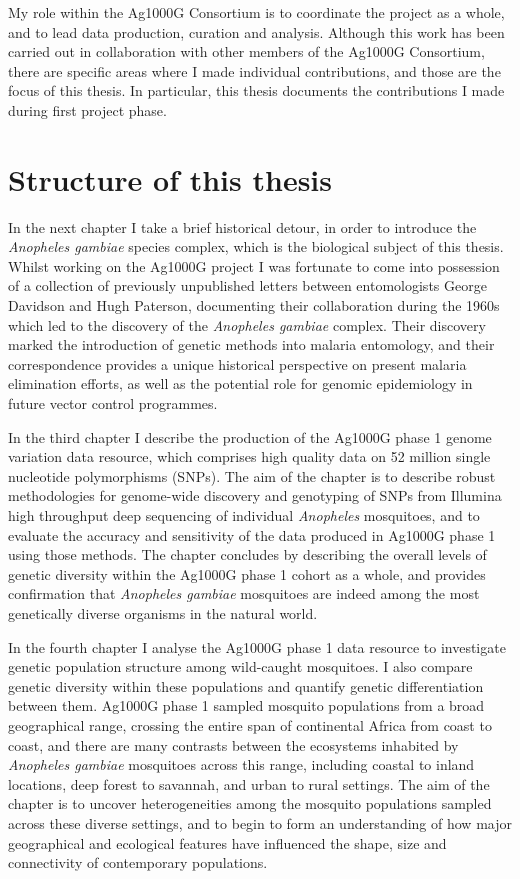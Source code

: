 \documentclass[a4paper,11pt,abstracton,hidelinks]{scrartcl}
\begin{document}
My role within the Ag1000G Consortium is to coordinate the project as a whole, and to lead data production, curation and analysis.
%
Although this work has been carried out in collaboration with other members of the Ag1000G Consortium, there are specific areas where I made individual contributions, and those are the focus of this thesis.
%
In particular, this thesis documents the contributions I made during first project phase.


\section{Structure of this thesis}


In the next chapter I take a brief historical detour, in order to introduce the \textit{Anopheles gambiae} species complex, which is the biological subject of this thesis.
%
Whilst working on the Ag1000G project I was fortunate to come into possession of a collection of previously unpublished letters between entomologists George Davidson and Hugh Paterson, documenting their collaboration during the 1960s which led to the discovery of the \textit{Anopheles gambiae} complex.
%
Their discovery marked the introduction of genetic methods into malaria entomology, and their correspondence provides a unique historical perspective on present malaria elimination efforts, as well as the potential role for genomic epidemiology in future vector control programmes.

In the third chapter I describe the production of the Ag1000G phase 1 genome variation data resource, which comprises high quality data on 52 million single nucleotide polymorphisms (SNPs).
%
The aim of the chapter is to describe robust methodologies for genome-wide discovery and genotyping of SNPs from Illumina high throughput deep sequencing of individual \textit{Anopheles} mosquitoes, and to evaluate the accuracy and sensitivity of the data produced in Ag1000G phase 1 using those methods.
%
The chapter concludes by describing the overall levels of genetic diversity within the Ag1000G phase 1 cohort as a whole, and provides confirmation that \textit{Anopheles gambiae} mosquitoes are indeed among the most genetically diverse organisms in the natural world.


In the fourth chapter I analyse the Ag1000G phase 1 data resource to investigate genetic population structure among wild-caught mosquitoes.
%
I also compare genetic diversity within these populations and quantify genetic differentiation between them.
%
Ag1000G phase 1 sampled mosquito populations from a broad geographical range, crossing the entire span of continental Africa from coast to coast, and there are many contrasts between the ecosystems inhabited by \textit{Anopheles gambiae} mosquitoes across this range, including coastal to inland locations, deep forest to savannah, and urban to rural settings.
%
The aim of the chapter is to uncover heterogeneities among the mosquito populations sampled across these diverse settings, and to begin to form an understanding of how major geographical and ecological features have influenced the shape, size and connectivity of contemporary populations.
\end{document}
